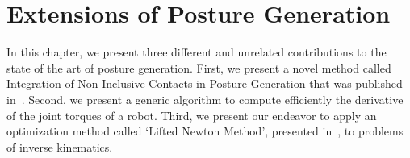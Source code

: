 

\chapter{Extensions of Posture Generation}
\label{cha:extensions_of_posture_generation}

\graphicspath{{Chapter2-Extensions/Figs/}{Chapter2-Extensions/Figs/IROS14/}}

In this chapter, we present three different and unrelated contributions to the state of the art of posture generation.
First, we present a novel method called Integration of Non-Inclusive Contacts in Posture Generation that was published in~\cite{brossette:iros:2014}.
Second, we present a generic algorithm to compute efficiently the derivative of the joint torques of a robot.
Third, we present our endeavor to apply an optimization method called `Lifted Newton Method', presented in~\cite{Albersmeyer:2010:LNM:1958447.1958472}, to problems of inverse kinematics.





